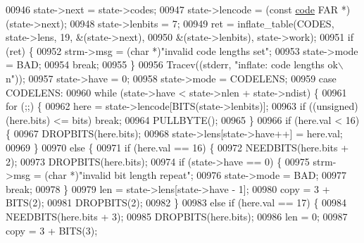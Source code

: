 \begin{DoxyCode}
{{{{{{{{00946             state->next = state->codes;
00947             state->lencode = (\textcolor{keyword}{const} \hyperlink{structcode}{code} FAR *)(state->next);
00948             state->lenbits = 7;
00949             ret = inflate\_table(CODES, state->lens, 19, &(state->next),
00950                                 &(state->lenbits), state->work);
00951             \textcolor{keywordflow}{if} (ret) \{
00952                 strm->msg = (\textcolor{keywordtype}{char} *)\textcolor{stringliteral}{"invalid code lengths set"};
00953                 state->mode = BAD;
00954                 \textcolor{keywordflow}{break};
00955             \}
00956             Tracev((stderr, \textcolor{stringliteral}{"inflate:       code lengths ok\(\backslash\)n"}));
00957             state->have = 0;
00958             state->mode = CODELENS;
00959         \textcolor{keywordflow}{case} CODELENS:
00960             \textcolor{keywordflow}{while} (state->have < state->nlen + state->ndist) \{
00961                 \textcolor{keywordflow}{for} (;;) \{
00962                     here = state->lencode[BITS(state->lenbits)];
00963                     \textcolor{keywordflow}{if} ((\textcolor{keywordtype}{unsigned})(here.bits) <= bits) \textcolor{keywordflow}{break};
00964                     PULLBYTE();
00965                 \}
00966                 \textcolor{keywordflow}{if} (here.val < 16) \{
00967                     DROPBITS(here.bits);
00968                     state->lens[state->have++] = here.val;
00969                 \}
00970                 \textcolor{keywordflow}{else} \{
00971                     \textcolor{keywordflow}{if} (here.val == 16) \{
00972                         NEEDBITS(here.bits + 2);
00973                         DROPBITS(here.bits);
00974                         \textcolor{keywordflow}{if} (state->have == 0) \{
00975                             strm->msg = (\textcolor{keywordtype}{char} *)\textcolor{stringliteral}{"invalid bit length repeat"};
00976                             state->mode = BAD;
00977                             \textcolor{keywordflow}{break};
00978                         \}
00979                         len = state->lens[state->have - 1];
00980                         copy = 3 + BITS(2);
00981                         DROPBITS(2);
00982                     \}
00983                     \textcolor{keywordflow}{else} \textcolor{keywordflow}{if} (here.val == 17) \{
00984                         NEEDBITS(here.bits + 3);
00985                         DROPBITS(here.bits);
00986                         len = 0;
00987                         copy = 3 + BITS(3);
}}}}}}}}
\end{DoxyCode}
